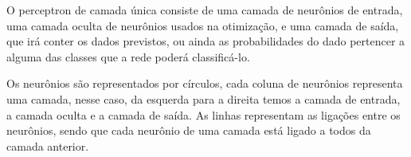 \documentclass[12pt,brazil]{article}
\begin{document}
O perceptron de camada única consiste de uma camada de neurônios de entrada, uma camada oculta de neurônios usados na otimização, e uma camada de saída, que irá conter os dados previstos, ou ainda as probabilidades do dado pertencer a alguma das classes que a rede poderá classificá-lo.

Os neurônios são representados por círculos, cada coluna de neurônios representa uma camada, nesse caso, da esquerda para a direita temos a camada de entrada, a camada oculta e a camada de saída. As linhas representam as ligações entre os neurônios, sendo que cada neurônio de uma camada está ligado a todos da camada anterior.



\pagebreak
\printbibliography[title=Referências]
\end{document}

